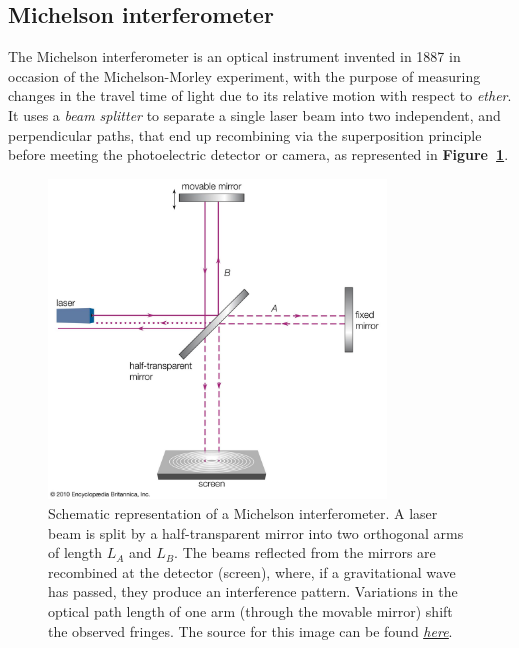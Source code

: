\subsection{Michelson interferometer}
The Michelson interferometer is an optical instrument invented in 1887 in occasion of the Michelson-Morley experiment, with the purpose of measuring changes in the travel time of light due to its relative motion with respect to \textit{ether}.
It uses a \textit{beam splitter} to separate a single laser beam into two independent, and perpendicular paths, that end up recombining via the superposition principle before meeting the photoelectric detector or camera, as represented in \textbf{Figure~\ref{fig: michaelson interferometer}}.
\begin{figure}
    \begin{center}
        \includegraphics[width=0.8\textwidth]{images/michaelson_interferometer.jpg}
    \end{center}
    \caption{Schematic representation of a Michelson interferometer. A laser beam is split by a half-transparent mirror into two orthogonal arms of length $L_A$ and $L_B$.
    The beams reflected from the mirrors are recombined at the detector (screen), where, if a gravitational wave has passed, they produce an interference pattern.
    Variations in the optical path length of one arm (through the movable mirror) shift the observed fringes.
The source for this image can be found \underline{\textit{\href{https://www.britannica.com/technology/Michelson-interferometer}{here}}}.}
    \label{fig: michaelson interferometer}
\end{figure}

